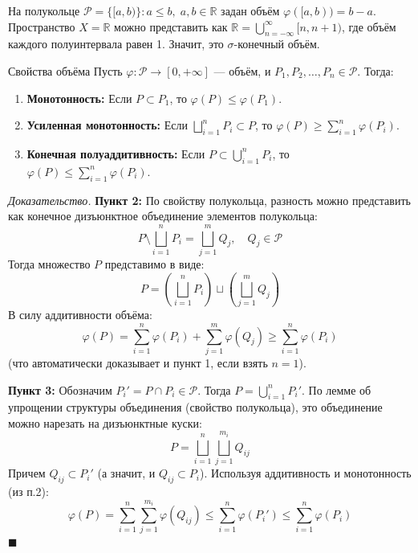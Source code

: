 \documentclass[12pt,a4paper]{article}
\newenvironment{Proof}[1][Доказательство]{\vspace{0.5em}\noindent\textit{#1.}\hspace{0.5em}\ignorespaces}{\hfill$\blacksquare$\vspace{1em}}
\begin{document}
\begin{Example}
На полукольце $\mathcal{P} = \{[a, b)\} : a \le b, \; a, b \in \mathbb{R}$ задан объём $\varphi([a, b)) = b - a$. Пространство $X = \mathbb{R}$ можно представить как $\mathbb{R} = \bigcup\limits_{n=-\infty}^{\infty} [n, n+1)$, где объём каждого полуинтервала равен 1. Значит, это $\sigma$-конечный объём.
\end{Example}

\begin{Theorem}{Свойства объёма}{}
Пусть $\varphi: \mathcal{P} \to [0, +\infty]$ — объём, и $P_1, P_2, \dots, P_n \in \mathcal{P}$. Тогда:
\begin{enumerate}
    \item \textbf{Монотонность:} Если $P \subset P_1$, то $\varphi(P) \le \varphi(P_1)$.
    \item \textbf{Усиленная монотонность:} Если $\bigsqcup\limits_{i=1}^n P_i \subset P$, то $\varphi(P) \ge \sum\limits_{i=1}^n \varphi(P_i)$.
    \item \textbf{Конечная полуаддитивность:} Если $P \subset \bigcup\limits_{i=1}^n P_i$, то $\varphi(P) \le \sum\limits_{i=1}^n \varphi(P_i)$.
\end{enumerate}
\end{Theorem}

\begin{Proof}[Доказательство]
\textbf{Пункт 2:} По свойству полукольца, разность можно представить как конечное дизъюнктное объединение элементов полукольца:
$$ P \setminus \bigsqcup\limits_{i=1}^n P_i = \bigsqcup\limits_{j=1}^m Q_j, \quad Q_j \in \mathcal{P} $$
Тогда множество $P$ представимо в виде:
$$ P = \left( \bigsqcup\limits_{i=1}^n P_i \right) \sqcup \left( \bigsqcup\limits_{j=1}^m Q_j \right) $$
В силу аддитивности объёма:
$$ \varphi(P) = \sum\limits_{i=1}^n \varphi(P_i) + \sum\limits_{j=1}^m \varphi(Q_j) \ge \sum\limits_{i=1}^n \varphi(P_i) $$
(что автоматически доказывает и пункт 1, если взять $n=1$).

\textbf{Пункт 3:} Обозначим $P_i' = P \cap P_i \in \mathcal{P}$. Тогда $P = \bigcup\limits_{i=1}^n P_i'$. По лемме об упрощении структуры объединения (свойство полукольца), это объединение можно нарезать на дизъюнктные куски:
$$ P = \bigsqcup\limits_{i=1}^n \bigsqcup\limits_{j=1}^{m_i} Q_{ij} $$
Причем $Q_{ij} \subset P_i'$ (а значит, и $Q_{ij} \subset P_i$).
Используя аддитивность и монотонность (из п.2):
$$ \varphi(P) = \sum\limits_{i=1}^n \sum\limits_{j=1}^{m_i} \varphi(Q_{ij}) \le \sum\limits_{i=1}^n \varphi(P_i') \le \sum\limits_{i=1}^n \varphi(P_i) $$
\end{Proof}
\end{document}
